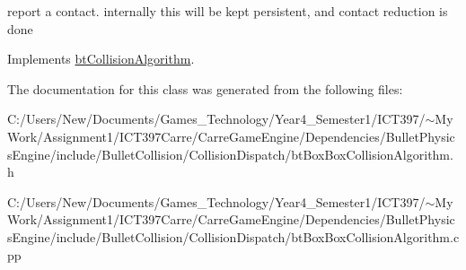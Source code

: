 report a contact. internally this will be kept persistent, and contact reduction is done 

Implements \hyperlink{classbt_collision_algorithm}{btCollisionAlgorithm}.

The documentation for this class was generated from the following files:\begin{CompactItemize}
\item 
C:/Users/New/Documents/Games\_\-Technology/Year4\_\-Semester1/ICT397/$\sim$My Work/Assignment1/ICT397Carre/CarreGameEngine/Dependencies/BulletPhysicsEngine/include/BulletCollision/CollisionDispatch/btBoxBoxCollisionAlgorithm.h\item 
C:/Users/New/Documents/Games\_\-Technology/Year4\_\-Semester1/ICT397/$\sim$My Work/Assignment1/ICT397Carre/CarreGameEngine/Dependencies/BulletPhysicsEngine/include/BulletCollision/CollisionDispatch/btBoxBoxCollisionAlgorithm.cpp\end{CompactItemize}
